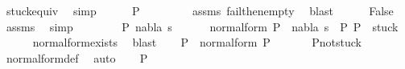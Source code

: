 \begin{isabellebody}
\ stuck{\isacharunderscore}{\kern0pt}equiv\ \isamarkupfalse%
\ simp\isanewline
\ \ \ \ \isamarkupfalse%
\ {\isachardoublequoteopen}P{}\ {\isacharequal}{\kern0pt}{\isacharparenleft}{\kern0pt}{\isacharbrackleft}{\kern0pt}{\isacharbrackright}{\kern0pt}{\isacharcomma}{\kern0pt}{\isacharbrackleft}{\kern0pt}{\isacharbrackright}{\kern0pt}{\isacharparenright}{\kern0pt}{\isachardoublequoteclose}\isanewline
\ \ \ \ \ \ \isamarkupfalse%
\ assms{\isacharparenleft}{\kern0pt}{}{\isacharparenright}{\kern0pt}\ fail{\isacharunderscore}{\kern0pt}then{\isacharunderscore}{\kern0pt}empty\ \isamarkupfalse%
\ blast\isanewline
\ \ \ \ \isamarkupfalse%
\ False\ \isamarkupfalse%
\ assms{\isacharparenleft}{\kern0pt}{}{\isacharparenright}{\kern0pt}\ \isamarkupfalse%
\ simp\isanewline
\ \ \isamarkupfalse%
\isanewline
\ \ \isamarkupfalse%
\ \isamarkupfalse%
\ P{}\ nabla{\isacharprime}{\kern0pt}\ s{\isacharprime}{\kern0pt}\ \ \isanewline
\ \ \ \ normal{\isacharunderscore}{\kern0pt}form{\isacharcolon}{\kern0pt}\ {\isachardoublequoteopen}P{}\ {\isasymTurnstile}\ {\isacharparenleft}{\kern0pt}nabla{\isacharprime}{\kern0pt}{\isacharcomma}{\kern0pt}\ s{\isacharprime}{\kern0pt}{\isacharparenright}{\kern0pt}\ {\isasymRightarrow}\ P{}{\isachardoublequoteclose}\ {\isachardoublequoteopen}P{}\ {\isasymin}\ stuck{\isachardoublequoteclose}\isanewline
\ \ \ \ \isamarkupfalse%
\ normal{\isacharunderscore}{\kern0pt}form{\isacharunderscore}{\kern0pt}exists\ \isamarkupfalse%
\ blast\isanewline
\ \ \isamarkupfalse%
\ {\isachardoublequoteopen}P{}\ {\isasymin}\ normal{\isacharunderscore}{\kern0pt}form\ P{}{\isachardoublequoteclose}\ \isanewline
\ \ \ \ \isamarkupfalse%
\ P{}{\isacharunderscore}{\kern0pt}not{\isacharunderscore}{\kern0pt}stuck\ \isamarkupfalse%
\ normal{\isacharunderscore}{\kern0pt}form{\isacharunderscore}{\kern0pt}def\ \isamarkupfalse%
\ auto\isanewline
\ \ \isamarkupfalse%
\ {\isachardoublequoteopen}P{}{\isacharequal}{\kern0pt}{\isacharparenleft}{\kern0pt}{\isacharbrackleft}{\kern0pt}{\isacharbrackright}{\kern0pt}{\isacharcomma}{\kern0pt}{\isacharbrackleft}{\kern0pt}{\isacharbrackright}{\kern0pt}{\isacharparenright}{\kern0pt}{\isachardoublequoteclose}\isanewline

\end{isabellebody}
